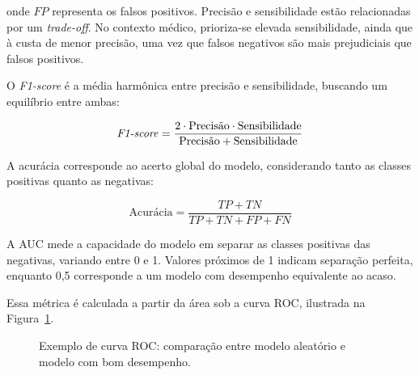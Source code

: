 \documentclass[
    12pt,                %
    openright,           %
    oneside,             %
    a4paper,             %
    brazil               %
]{abntex2}
\begin{document}
onde $FP$ representa os falsos positivos. Precisão e sensibilidade estão relacionadas por um \textit{trade-off}. No contexto médico, prioriza-se elevada sensibilidade, ainda que à custa de menor precisão, uma vez que falsos negativos são mais prejudiciais que falsos positivos.  

O \textit{F1-score} é a média harmônica entre precisão e sensibilidade, buscando um equilíbrio entre ambas:

\begin{equation}
\text{\textit{F1-score}} = \frac{2 \cdot \text{Precisão} \cdot \text{Sensibilidade}}{\text{Precisão} + \text{Sensibilidade}}
\end{equation}

A acurácia corresponde ao acerto global do modelo, considerando tanto as classes positivas quanto as negativas:

\begin{equation}
\text{Acurácia} = \frac{TP + TN}{TP + TN + FP + FN}
\end{equation}

A AUC mede a capacidade do modelo em separar as classes positivas das negativas, variando entre 0 e 1. Valores próximos de 1 indicam separação perfeita, enquanto 0,5 corresponde a um modelo com desempenho equivalente ao acaso. 

Essa métrica é calculada a partir da área sob a curva ROC, ilustrada na Figura~\ref{fig:roc}.


\begin{figure}[H]
    \centering
    \caption{Exemplo de curva ROC: comparação entre modelo aleatório e modelo com bom desempenho.}
    \label{fig:roc}
\end{figure}
\end{document}
